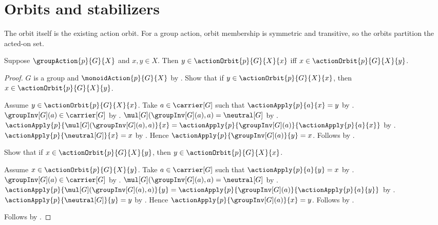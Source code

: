 





\section{Orbits and stabilizers}

The orbit itself is the existing action orbit.  For a group action, orbit
membership is symmetric and transitive, so the orbits partition the acted-on
set.

\begin{proposition}\label{group_action_orbit_symmetric}
    Suppose $\groupAction{p}{G}{X}$ and $x,y\in X$.
    Then $y\in\actionOrbit{p}{G}{X}{x}$ iff
        $x\in\actionOrbit{p}{G}{X}{y}$.
\end{proposition}
\begin{proof}
    $G$ is a group and $\monoidAction{p}{G}{X}$ by
        .
    Show that if $y\in\actionOrbit{p}{G}{X}{x}$, then
        $x\in\actionOrbit{p}{G}{X}{y}$.
    \begin{subproof}
        Assume $y\in\actionOrbit{p}{G}{X}{x}$.
        Take $a\in\carrier[G]$ such that
            $\actionApply{p}{a}{x}=y$ by .
        $\groupInv[G](a)\in\carrier[G]$ by .
        $\mul[G](\groupInv[G](a),a)=\neutral[G]$ by
            .
        $\actionApply{p}{\mul[G](\groupInv[G](a),a)}{x}
            =\actionApply{p}{\groupInv[G](a)}{
                \actionApply{p}{a}{x}}$ by
            .
        $\actionApply{p}{\neutral[G]}{x}=x$ by
            .
        Hence $\actionApply{p}{\groupInv[G](a)}{y}=x$.
        Follows by .
    \end{subproof}
    Show that if $x\in\actionOrbit{p}{G}{X}{y}$, then
        $y\in\actionOrbit{p}{G}{X}{x}$.
    \begin{subproof}
        Assume $x\in\actionOrbit{p}{G}{X}{y}$.
        Take $a\in\carrier[G]$ such that
            $\actionApply{p}{a}{y}=x$ by .
        $\groupInv[G](a)\in\carrier[G]$ by .
        $\mul[G](\groupInv[G](a),a)=\neutral[G]$ by
            .
        $\actionApply{p}{\mul[G](\groupInv[G](a),a)}{y}
            =\actionApply{p}{\groupInv[G](a)}{
                \actionApply{p}{a}{y}}$ by
            .
        $\actionApply{p}{\neutral[G]}{y}=y$ by
            .
        Hence $\actionApply{p}{\groupInv[G](a)}{x}=y$.
        Follows by .
    \end{subproof}
    Follows by \auto.
\end{proof}

